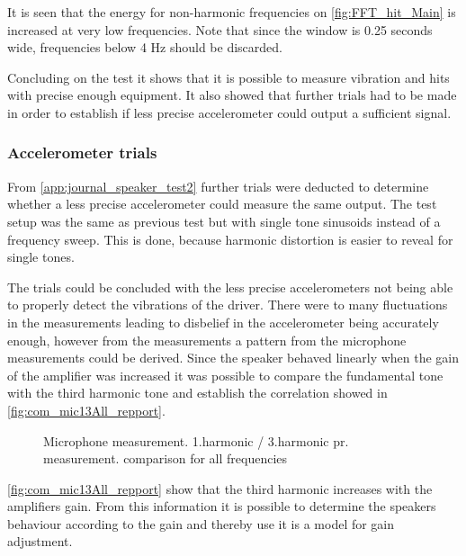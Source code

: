 %


It is seen that the energy for non-harmonic frequencies on \autoref{fig:FFT_hit_Main} is increased at very low frequencies. %
Note that since the window is 0.25 seconds wide, frequencies below 4 Hz should be discarded.

Concluding on the test it shows that it is possible to measure vibration and hits with precise enough equipment. It also showed that further trials had to be made in order to establish if less precise accelerometer could output a sufficient signal.

\subsubsection{Accelerometer trials}

From \autoref{app:journal_speaker_test2} further trials were deducted to determine whether a less precise accelerometer could measure the same output. The test setup was the same as previous test but with single tone sinusoids instead of a frequency sweep. This is done, because harmonic distortion is easier to reveal for single tones. %

The trials could be concluded with the less precise accelerometers not being able to properly detect the vibrations of the driver. There were to many fluctuations in the measurements leading to disbelief in the accelerometer being accurately enough, however from the measurements a pattern from the microphone measurements could be derived. Since the speaker behaved linearly when the gain of the amplifier was increased it was possible to compare the fundamental tone with the third harmonic tone and establish the correlation showed in \autoref{fig:com_mic13All_repport}.

\begin{figure}[H]
    \centering
    
    \caption{Microphone measurement. 1.harmonic / 3.harmonic pr. measurement. comparison for all frequencies}
\label{fig:com_mic13All_repport}
\end{figure}  

\autoref{fig:com_mic13All_repport} show that the third harmonic increases with the amplifiers gain. From this information it is possible to determine the speakers behaviour according to the gain and thereby use it is a model for gain adjustment.


